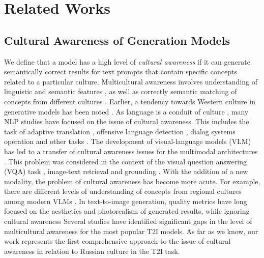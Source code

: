 \section{Related Works}
\subsection{Cultural Awareness of Generation Models}

We define that a model has a high level of \textit{cultural awareness} if it can generate semantically correct results for text prompts that contain specific concepts related to a particular culture. Multicultural awareness involves understanding of linguistic and semantic features \cite{wibowo2023copal}, as well as correctly semantic matching of concepts from different cultures \cite{10.1162/tacl_a_00634}. Earlier, a tendency towards Western culture in generative models has been noted \cite{bhatia2024localconceptsuniversalsevaluating, 10.1145/3600211.3604711, berg-etal-2022-prompt}. As language is a conduit of culture \cite{ventura2023navigating}, many NLP studies have focused on the issue of cultural awareness. This includes the task of adaptive translation \cite{peskov-etal-2021-adapting-entities}, offensive language detection \cite{zhou-etal-2023-cultural, 10100717}, dialog systems operation \cite{cao-etal-2024-bridging} and other tasks \cite{hershcovich-etal-2022-challenges}. The development of visual-language models (VLM) has led to a transfer of cultural awareness issues for the multimodal architectures \cite{nayak2024benchmarkingvisionlanguagemodels}. This problem was considered in the context of the visual question answering (VQA) task \cite{10.1145/3590773, romero2024cvqaculturallydiversemultilingualvisual}, image-text retrieval and grounding \cite{bhatia2024localconceptsuniversalsevaluating}. With the addition of a new modality, the problem of cultural awareness has become more acute. For example, there are different levels of understanding of concepts from regional cultures among modern VLMs \cite{nayak2024benchmarkingvisionlanguagemodels}. 
In text-to-image generation, quality metrics have long focused on the aesthetics and photorealism of generated results, while ignoring cultural awareness \cite{kannen2024aestheticsculturalcompetencetexttoimage} Several studies have identified significant gaps in the level of multicultural awareness for the most popular T2I models. As far as we know, our work represents the first comprehensive approach to the issue of cultural awareness in relation to Russian culture in the T2I task.

